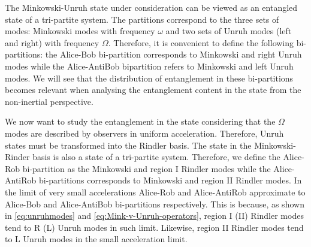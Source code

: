 The Minkowski-Unruh state under consideration can be viewed as an entangled state of a  tri-partite system.  The partitions correspond to the three sets of modes:  Minkowski modes with  frequency $\omega$ and  two sets of Unruh modes (left and right) with frequency $\Omega$.  Therefore, it is convenient to define the following bi-partitions: the Alice-Bob bi-partition corresponds to Minkowski and right Unruh modes while the Alice-AntiBob bipartition refers to Minkowski and left Unruh modes. We will see that the distribution of entanglement in these bi-partitions becomes relevant when analysing the entanglement content in the state from the non-inertial perspective. 

 We now want to study the entanglement in the state considering that the $\Omega$ modes are  described by observers in uniform acceleration.  Therefore, Unruh states must be transformed into the Rindler basis. The state in the Minkowski-Rinder basis is also a state of a tri-partite system.  Therefore, we define the Alice-Rob bi-partition as the Minkowski and region I Rindler modes while the Alice-AntiRob bi-partitions corresponds to Minkowski and region II Rindler modes.  In the limit of very small accelerations Alice-Rob and Alice-AntiRob approximate to Alice-Bob and Alice-AntiBob bi-partitions respectively. This is because, as shown in \eqref{eq:unruhmodes} and \eqref{eq:Mink-v-Unruh-operators},  region I (II) Rindler modes tend to R (L) Unruh modes in such limit. Likewise,  region II Rindler modes tend to L Unruh modes in the small acceleration limit.


